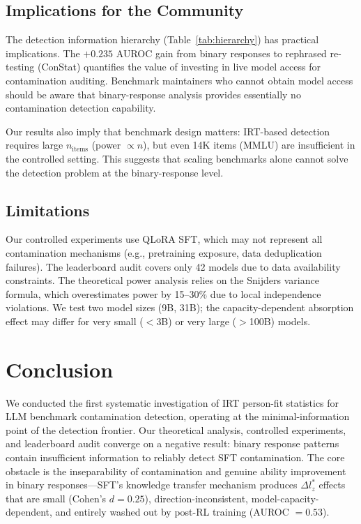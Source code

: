 \documentclass[11pt]{article}
\begin{document}
\subsection{Implications for the Community}

The detection information hierarchy (Table~\ref{tab:hierarchy}) has practical implications.
The $+0.235$ AUROC gain from binary responses to rephrased re-testing (ConStat) quantifies the value of investing in live model access for contamination auditing.
Benchmark maintainers who cannot obtain model access should be aware that binary-response analysis provides essentially no contamination detection capability.

Our results also imply that benchmark design matters: IRT-based detection requires large $n_\text{items}$ (power $\propto n$), but even 14K items (MMLU) are insufficient in the controlled setting.
This suggests that scaling benchmarks alone cannot solve the detection problem at the binary-response level.

\subsection{Limitations}

Our controlled experiments use QLoRA SFT, which may not represent all contamination mechanisms (e.g., pretraining exposure, data deduplication failures).
The leaderboard audit covers only 42 models due to data availability constraints.
The theoretical power analysis relies on the Snijders variance formula, which overestimates power by 15--30\% due to local independence violations.
We test two model sizes (9B, 31B); the capacity-dependent absorption effect may differ for very small ($<$3B) or very large ($>$100B) models.

\section{Conclusion}

We conducted the first systematic investigation of IRT person-fit statistics for LLM benchmark contamination detection, operating at the minimal-information point of the detection frontier.
Our theoretical analysis, controlled experiments, and leaderboard audit converge on a negative result: binary response patterns contain insufficient information to reliably detect SFT contamination.
The core obstacle is the inseparability of contamination and genuine ability improvement in binary responses---SFT's knowledge transfer mechanism produces $\Delta l_z^*$ effects that are small (Cohen's $d = 0.25$), direction-inconsistent, model-capacity-dependent, and entirely washed out by post-RL training (AUROC $= 0.53$).
\end{document}
